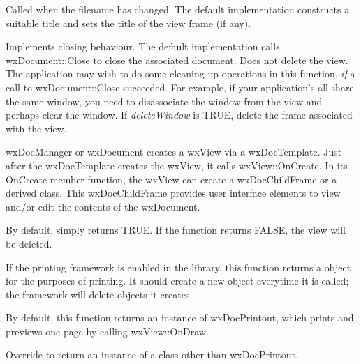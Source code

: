 

Called when the filename has changed. The default implementation constructs a
suitable title and sets the title of the view frame (if any).



Implements closing behaviour. The default implementation calls wxDocument::Close
to close the associated document. Does not delete the view. The application
may wish to do some cleaning up operations in this function, {\it if} a
call to wxDocument::Close succeeded. For example, if your application's
all share the same window, you need to disassociate the window from the view
and perhaps clear the window. If {\it deleteWindow} is TRUE, delete the
frame associated with the view.



wxDocManager or wxDocument creates a wxView via a wxDocTemplate.
Just after the wxDocTemplate creates the wxView, it calls
wxView::OnCreate. In its OnCreate member function, the wxView can create a wxDocChildFrame
or a derived class. This wxDocChildFrame provides user interface
elements to view and/or edit the contents of the wxDocument.

By default, simply returns TRUE. If the function returns FALSE, the
view will be deleted.



If the printing framework is enabled in the library, this function returns a
\rtfsp{} object for the purposes of printing. It should create a new object
everytime it is called; the framework will delete objects it creates.

By default, this function returns an instance of wxDocPrintout, which prints
and previews one page by calling wxView::OnDraw.

Override to return an instance of a class other than wxDocPrintout.



